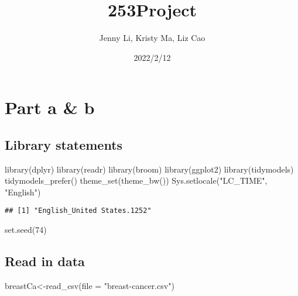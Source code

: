 \documentclass[
]{article}
\title{253Project}
\author{Jenny Li, Kristy Ma, Liz Cao}
\date{2022/2/12}
\newenvironment{Shaded}{\begin{snugshade}}{\end{snugshade}}
\newcommand{\AttributeTok}[1]{\textcolor[rgb]{0.77,0.63,0.00}{#1}}
\newcommand{\DecValTok}[1]{\textcolor[rgb]{0.00,0.00,0.81}{#1}}
\newcommand{\FunctionTok}[1]{\textcolor[rgb]{0.00,0.00,0.00}{#1}}
\newcommand{\NormalTok}[1]{#1}
\newcommand{\OtherTok}[1]{\textcolor[rgb]{0.56,0.35,0.01}{#1}}
\newcommand{\StringTok}[1]{\textcolor[rgb]{0.31,0.60,0.02}{#1}}
\begin{document}
\maketitle

{
\setcounter{tocdepth}{2}
\tableofcontents
}
\hypertarget{part-a-b}{%
\section{Part a \& b}\label{part-a-b}}

\hypertarget{library-statements}{%
\subsection{Library statements}\label{library-statements}}

\begin{Shaded}
\begin{Highlighting}[]
\FunctionTok{library}\NormalTok{(dplyr)}
\FunctionTok{library}\NormalTok{(readr)}
\FunctionTok{library}\NormalTok{(broom)}
\FunctionTok{library}\NormalTok{(ggplot2)}
\FunctionTok{library}\NormalTok{(tidymodels) }
\FunctionTok{tidymodels\_prefer}\NormalTok{()}
\FunctionTok{theme\_set}\NormalTok{(}\FunctionTok{theme\_bw}\NormalTok{())       }
\FunctionTok{Sys.setlocale}\NormalTok{(}\StringTok{"LC\_TIME"}\NormalTok{, }\StringTok{"English"}\NormalTok{)}
\end{Highlighting}
\end{Shaded}

\begin{verbatim}
## [1] "English_United States.1252"
\end{verbatim}

\begin{Shaded}
\begin{Highlighting}[]
\FunctionTok{set.seed}\NormalTok{(}\DecValTok{74}\NormalTok{)}
\end{Highlighting}
\end{Shaded}

\hypertarget{read-in-data}{%
\subsection{Read in data}\label{read-in-data}}

\begin{Shaded}
\begin{Highlighting}[]
\NormalTok{breastCa}\OtherTok{\textless{}{-}}\FunctionTok{read\_csv}\NormalTok{(}\AttributeTok{file =} \StringTok{"breast{-}cancer.csv"}\NormalTok{)}
\end{Highlighting}
\end{Shaded}
\end{document}
